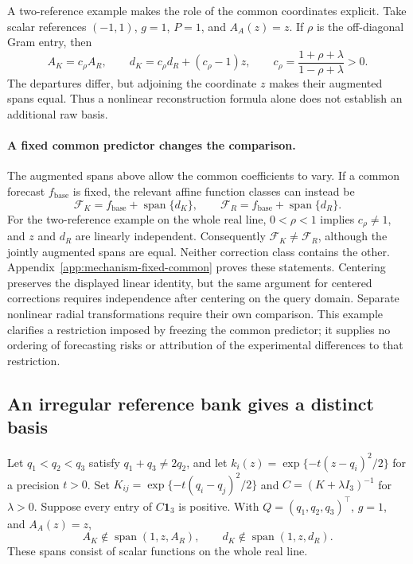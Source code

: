 A two-reference example makes the role of the common coordinates
explicit. Take scalar references $(-1,1)$, $g=1$, $P=1$, and
$A_A(z)=z$. If $\rho$ is the off-diagonal Gram entry, then
\[
 A_K=c_\rho A_R,\qquad
 d_K=c_\rho d_R+(c_\rho-1)z,\qquad
 c_\rho=\frac{1+\rho+\lambda}{1-\rho+\lambda}>0.
\]
The departures differ, but adjoining the coordinate $z$ makes their
augmented spans equal. Thus a nonlinear reconstruction formula alone
does not establish an additional raw basis.

\paragraph{A fixed common predictor changes the comparison.}
The augmented spans above allow the common coefficients to vary. If a
common forecast $f_{\mathrm{base}}$ is fixed, the relevant affine
function classes can instead be
\begin{equation}
 \mathcal F_K=f_{\mathrm{base}}+\operatorname{span}\{d_K\},\qquad
 \mathcal F_R=f_{\mathrm{base}}+\operatorname{span}\{d_R\}.
 \label{eq:mechanism-fixed-common-classes}
\end{equation}
For the two-reference example on the whole real line, $0<\rho<1$
implies $c_\rho\ne1$, and $z$ and $d_R$ are linearly independent.
Consequently $\mathcal F_K\ne\mathcal F_R$, although the jointly
augmented spans are equal. Neither correction class contains the other.
Appendix~\ref{app:mechanism-fixed-common} proves these statements.
Centering preserves the displayed linear identity, but the same argument
for centered corrections requires independence after centering on the
query domain. Separate nonlinear radial transformations require their
own comparison. This example clarifies a restriction imposed by freezing
the common predictor; it supplies no ordering of forecasting risks or
attribution of the experimental differences to that restriction.

\subsection{An irregular reference bank gives a distinct basis}

\begin{proposition}
\label{prop:mechanism-distinct}
Let $q_1<q_2<q_3$ satisfy $q_1+q_3\ne2q_2$, and let
$k_i(z)=\exp\{-t(z-q_i)^2/2\}$ for a precision $t>0$.
Set $K_{ij}=\exp\{-t(q_i-q_j)^2/2\}$ and
$C=(K+\lambda I_3)^{-1}$ for $\lambda>0$.
Suppose every entry of $C\mathbf1_3$ is positive. With
$Q=(q_1,q_2,q_3)^\top$, $g=1$, and $A_A(z)=z$,
\[
 A_K\notin\operatorname{span}(1,z,A_R),\qquad
 d_K\notin\operatorname{span}(1,z,d_R).
\]
These spans consist of scalar functions on the whole real line.
\end{proposition}

